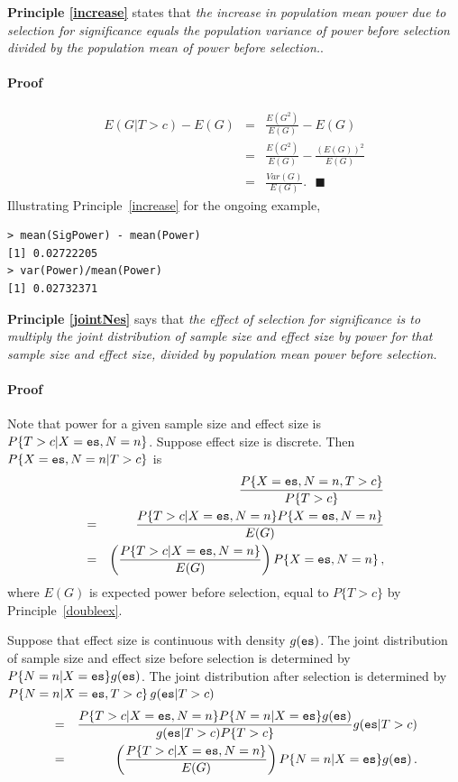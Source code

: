\documentclass[jou]{apa6} %
\newcommand{\R}[1]{\mbox{\texttt{#1}}} %
\begin{document}
\textbf{Principle \ref{increase}} states that \emph{the increase in population mean power due to selection for significance equals the population variance of power before selection divided by the population mean of power before selection.}.

\paragraph{Proof} 
\begin{eqnarray*} \label{Increase}
  E(G|T>c) - E(G) &=& \frac{E(G^2)}{E(G)} - E(G) \\
                  &=& \frac{E(G^2)}{E(G)} - \frac{\left(E(G)\right)^2}{E(G)} \\
                  &=& \frac{Var(G)}{E(G)}.  ~~~\blacksquare
\end{eqnarray*}
Illustrating Principle~\ref{increase} for the ongoing example,
{\footnotesize
\begin{verbatim}
> mean(SigPower) - mean(Power)
[1] 0.02722205
> var(Power)/mean(Power)
[1] 0.02732371
\end{verbatim}
} %

\textbf{Principle \ref{jointNes}} says that \emph{the effect of selection for significance is to multiply the joint distribution of sample size and effect size by power for that sample size and effect size, divided by population mean power before selection.}

\paragraph{Proof} Note that power for a given sample size and effect size is $P\{T>c|X=\R{es},N=n\}$. Suppose effect size is discrete. Then $P\{X=\R{es},N=n|T>c\}$ is 
\begin{eqnarray*}
    &   & \frac{P\{X=\R{es},N=n,T>c\}}{P\{T>c\}} \\
    & = & \frac{ P\{T>c|X=\R{es},N=n\}P\{X=\R{es},N=n\} }{E(G)} \\
    & = & \left( \frac{ P\{T>c|X=\R{es},N=n\} }{E(G)} \right) P\{X=\R{es},N=n\} \, ,
\end{eqnarray*}
where  $E(G)$ is expected power before selection, equal to $P\{T>c\}$ by Principle~\ref{doubleex}.

Suppose that effect size is continuous with density $g(\R{es})$. The joint distribution of sample size and effect size before selection is determined by $P\{N=n|X=\R{es}\}g(\R{es})$. The joint distribution after selection is determined by \\ $P\{N=n|X=\R{es},T>c\}\,g(\R{es}|T>c)$
{\small
\begin{eqnarray*}
    & = & 
   \frac{P\{T>c|X=\R{es},N=n\}P\{N=n|X=\R{es}\}g(\R{es})}
        {g(\R{es}|T>c)P\{T>c\}}  g(\R{es}|T>c) \\
    & = & 
    \left( \frac{ P\{T>c|X=\R{es},N=n\} }{E(G)} \right)
    P\{N=n|X=\R{es}\}g(\R{es})  \, .
\end{eqnarray*}
} %
\end{document}
